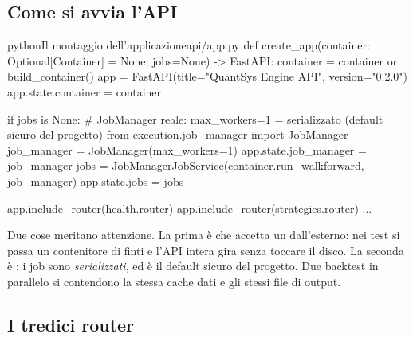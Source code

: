 \subsection{Come si avvia l'API}

\begin{codiceInterno}{python}{Il montaggio dell'applicazione}{api/app.py}
def create_app(container: Optional[Container] = None, jobs=None) -> FastAPI:
    container = container or build_container()
    app = FastAPI(title="QuantSys Engine API", version="0.2.0")
    app.state.container = container

    if jobs is None:
        # JobManager reale: max_workers=1 = serializzato (default sicuro del progetto)
        from execution.job_manager import JobManager
        job_manager = JobManager(max_workers=1)
        app.state.job_manager = job_manager
        jobs = JobManagerJobService(container.run_walkforward, job_manager)
    app.state.jobs = jobs

    app.include_router(health.router)
    app.include_router(strategies.router)
    ...
\end{codiceInterno}

\noindent
Due cose meritano attenzione. La prima è che  accetta un
 dall'esterno: nei test si passa un contenitore di finti e
l'API intera gira senza toccare il disco. La seconda è
: i job sono \emph{serializzati}, ed è il default sicuro
del progetto. Due backtest in parallelo si contendono la stessa cache dati e
gli stessi file di output.

\subsection{I tredici router}

